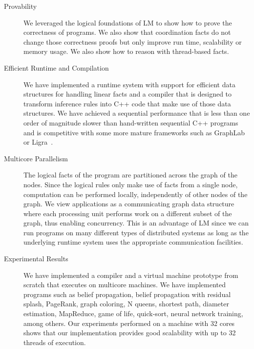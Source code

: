\begin{description}
   \item[Provability]
   
   We leveraged the logical foundations of LM to show how to prove the correctness
   of programs. We also show that coordination facts do not change those
   correctness proofs but only improve run time, scalability or memory usage. We
   also show how to reason with thread-based facts.

\item[Efficient Runtime and Compilation]

   We have implemented a runtime system with support for efficient data
   structures for handling linear facts and a compiler that is designed to
   transform inference rules into C++ code that make use of those data
   structures. We have achieved a sequential performance that is less than one
   order of magnitude slower than hand-written sequential C++ programs and is
   competitive with some more mature frameworks such as
   GraphLab~\cite{GraphLab2010} or Ligra~\cite{Shun:2013:LLG:2517327.2442530}.

\item[Multicore Parallelism]
   
   The logical facts of the program are partitioned across the graph of the
   nodes. Since the logical rules only make use of facts from a single node,
   computation can be performed locally, independently of other nodes of the
   graph. We view applications as a communicating graph data structure where
   each processing unit performs work on a different subset of the graph, thus
   enabling concurrency. This is an advantage of LM since we can run programs on
   many different types of distributed systems as long as the underlying runtime
   system uses the appropriate communication facilities.

\item[Experimental Results]

   We have implemented a compiler and a virtual machine prototype from scratch
   that executes on multicore machines.  We have implemented programs such as
   belief propagation, belief propagation with residual splash, PageRank, graph
   coloring, N queens, shortest path, diameter estimation, MapReduce, game of
   life, quick-sort, neural network training, among others. Our experiments
   performed on a machine with 32 cores shows that our implementation provides
   good scalability with up to 32 threads of execution.
   
\end{description}
